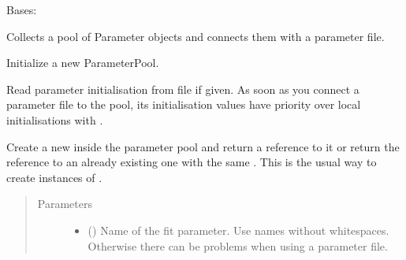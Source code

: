 \documentclass[letterpaper,10pt,english]{sphinxmanual}
\begin{document}
\begin{fulllineitems}
\label{\detokenize{modules-api/parameters:Parameters.ParameterPool}}
Bases: 

Collects a pool of Parameter objects and connects them with a parameter file.

\begin{fulllineitems}
\label{\detokenize{modules-api/parameters:Parameters.ParameterPool.__init__}}
Initialize a new ParameterPool.

Read parameter initialisation from file  if given. As soon as you connect a parameter file to the pool, its initialisation values have priority
over local initialisations with {\hyperref[\detokenize{modules-api/parameters:Parameters.ParameterPool.newParameter}]{}}.

\end{fulllineitems}


\begin{fulllineitems}
\label{\detokenize{modules-api/parameters:Parameters.ParameterPool.newParameter}}
Create a new {\hyperref[\detokenize{modules-api/parameters:Parameters.Fitparameter}]{}} inside the parameter pool and return a reference to it or
return the reference to an already existing one with the same .
This is the usual way to create instances of {\hyperref[\detokenize{modules-api/parameters:Parameters.Fitparameter}]{}}.
\begin{quote}\begin{description}
\item[{Parameters}] \leavevmode\begin{itemize}
\item {} 
 () \textendash{} Name of the fit parameter. Use names without whitespaces. Otherwise there can be problems when using a parameter file.


\end{itemize}
\end{description}
\end{quote}
\end{fulllineitems}
\end{fulllineitems}
\end{document}
